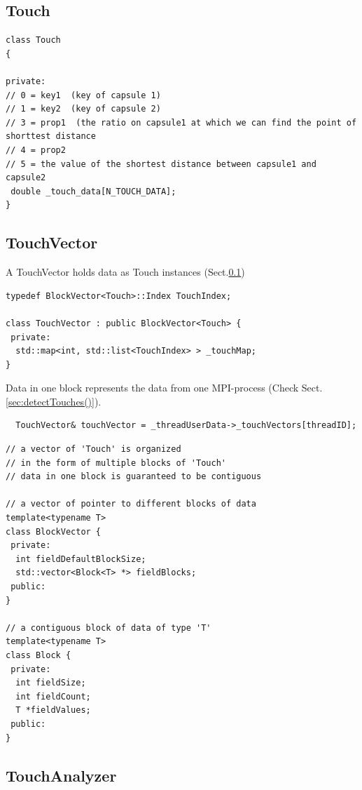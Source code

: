 \subsection{Touch}
\label{sec:Touch}

\begin{verbatim}
class Touch
{

private:
// 0 = key1  (key of capsule 1)
// 1 = key2  (key of capsule 2)
// 3 = prop1  (the ratio on capsule1 at which we can find the point of shorttest distance
// 4 = prop2 
// 5 = the value of the shortest distance between capsule1 and capsule2
 double _touch_data[N_TOUCH_DATA];
}
\end{verbatim}

\subsection{TouchVector}
\label{sec:TouchVector}

A TouchVector holds data as Touch instances (Sect.\ref{sec:Touch})
\begin{verbatim}
typedef BlockVector<Touch>::Index TouchIndex;

class TouchVector : public BlockVector<Touch> {
 private:
  std::map<int, std::list<TouchIndex> > _touchMap;
}
\end{verbatim}


Data in one block represents the data from one MPI-process (Check
Sect.\ref{sec:detectTouches()}).

\begin{verbatim}
  TouchVector& touchVector = _threadUserData->_touchVectors[threadID];
\end{verbatim}

\begin{lstlisting}
// a vector of 'Touch' is organized
// in the form of multiple blocks of 'Touch'
// data in one block is guaranteed to be contiguous

// a vector of pointer to different blocks of data
template<typename T> 
class BlockVector {
 private:
  int fieldDefaultBlockSize;
  std::vector<Block<T> *> fieldBlocks;
 public:
}

// a contiguous block of data of type 'T'
template<typename T> 
class Block {
 private:
  int fieldSize;
  int fieldCount;
  T *fieldValues;
 public:
}
\end{lstlisting}

\subsection{TouchAnalyzer}
\label{sec:TouchAnalyzer}


